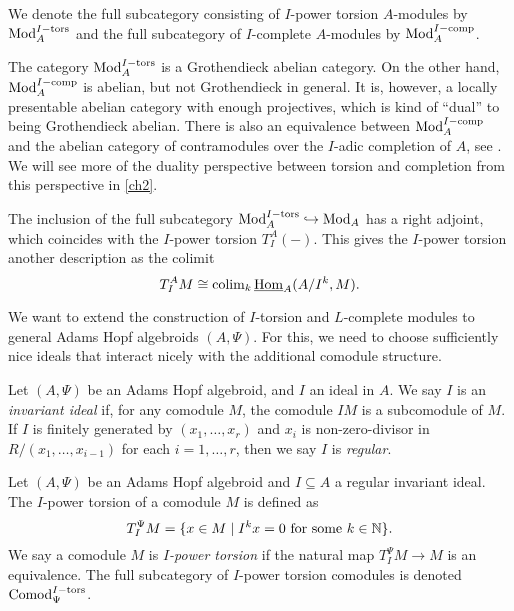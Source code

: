 \begin{notation}
    We denote the full subcategory consisting of $I$-power torsion $A$-modules by $\mathrm{Mod}_A^{I-\mathrm{tors}}$ and the full subcategory of $I$-complete $A$-modules by $\mathrm{Mod}_A^{I-\mathrm{comp}}$. 
\end{notation}

\begin{remark}
    The category $\mathrm{Mod}_A^{I-\mathrm{tors}}$ is a Grothendieck abelian category. On the other hand, $\mathrm{Mod}_A^{I-\mathrm{comp}}$ is abelian, but not Grothendieck in general. It is, however, a locally presentable abelian category with enough projectives, which is kind of ``dual'' to being Grothendieck abelian. There is also an equivalence between $\mathrm{Mod}_A^{I-\mathrm{comp}}$ and the abelian category of contramodules over the $I$-adic completion of $A$, see \cite[Section 2.2]{positselski_2022_contramodules}. We will see more of the duality perspective between torsion and completion from this perspective in \cref{ch2}. 
\end{remark}

The inclusion of the full subcategory $\mathrm{Mod}_A^{I-\mathrm{tors}}\hookrightarrow \mathrm{Mod}_A$ has a right adjoint, which coincides with the $I$-power torsion $T_I^A(-)$. This gives the $I$-power torsion another description as the colimit 
\[T_I^A M \cong \operatorname{colim}_k \operatorname{\underline{Hom}}_A (A/I^k, M).\]

We want to extend the construction of $I$-torsion and $L$-complete modules to general Adams Hopf algebroids $(A,\Psi)$. For this, we need to choose sufficiently nice ideals that interact nicely with the additional comodule structure. 

\begin{definition}
    Let $(A, \Psi)$ be an Adams Hopf algebroid, and $I$ an ideal in $A$. We say $I$ is an \emph{invariant ideal} if, for any comodule $M$, the comodule $IM$ is a subcomodule of $M$. If $I$ is finitely generated by $(x_1, \ldots, x_r)$ and $x_i$ is non-zero-divisor in $R/(x_1, \ldots, x_{i-1})$ for each $i=1, \ldots, r$, then we say $I$ is \emph{regular}. 
\end{definition}

\begin{definition}
    \label{ch0:def:I-power-torsion-comodule}
    Let $(A,\Psi)$ be an Adams Hopf algebroid and $I\subseteq A$ a regular invariant ideal. The $I$-power torsion of a comodule $M$ is defined as 
    \[T_I^\Psi M = \{x\in M \mid I^kx = 0 \text{ for some } k\in \mathbb{N}\}.\]
    We say a comodule $M$ is \emph{$I$-power torsion} if the natural map $T_I^\Psi M\longrightarrow M$ is an equivalence. The full subcategory of $I$-power torsion comodules is denoted $\mathrm{Comod}_\Psi^{I-\mathrm{tors}}$. 
\end{definition}

